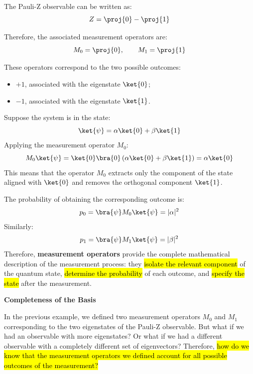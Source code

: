 \begin{examplebox}
    The Pauli-Z observable can be written as:
    \begin{equation*}
        Z = \proj{0} - \proj{1}
    \end{equation*}

    Therefore, the associated measurement operators are:
    \begin{equation*}
        M_0 = \proj{0},
        \qquad
        M_1 = \proj{1}
    \end{equation*}

    These operators correspond to the two possible outcomes:
    \begin{itemize}
        \item $+1$, associated with the eigenstate $\ket{0}$;
        \item $-1$, associated with the eigenstate $\ket{1}$.
    \end{itemize}
\end{examplebox}

\noindent
Suppose the system is in the state:
\begin{equation*}
    \ket{\psi}
    =
    \alpha \ket{0}
    +
    \beta \ket{1}
\end{equation*}
Applying the measurement operator $M_0$:
\begin{equation*}
    M_0 \ket{\psi}
    =
    \ket{0}\bra{0}
    \left(
        \alpha \ket{0}
        +
        \beta \ket{1}
    \right)
    =
    \alpha \ket{0}
\end{equation*}
This means that the operator $M_0$ extracts only the component of the state aligned with $\ket{0}$ and removes the orthogonal component $\ket{1}$.

\highspace
The probability of obtaining the corresponding outcome is:
\begin{equation*}
    p_0
    =
    \bra{\psi} M_0 \ket{\psi}
    =
    |\alpha|^2
\end{equation*}
Similarly:
\begin{equation*}
    p_1
    =
    \bra{\psi} M_1 \ket{\psi}
    =
    |\beta|^2
\end{equation*}
Therefore, \textbf{measurement operators} provide the complete mathematical description of the measurement process: they \hl{isolate the relevant component} of the quantum state, \hl{determine the probability} of each outcome, and \hl{specify the state} after the measurement.

\highspace
\begin{flushleft}
    \textcolor{Green3}{ \textbf{Completeness of the Basis}}
\end{flushleft}
In the previous example, we defined two measurement operators $M_0$ and $M_1$ corresponding to the two eigenstates of the Pauli-Z observable. But what if we had an observable with more eigenstates? Or what if we had a different observable with a completely different set of eigenvectors? Therefore, \hl{how do we know that the measurement operators we defined account for all possible outcomes of the measurement?}

